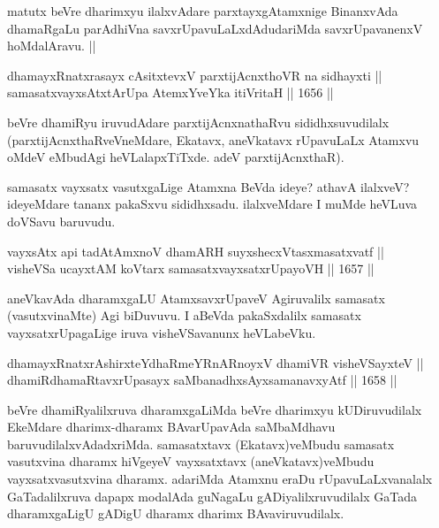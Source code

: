 \begin{artha}
matutx beVre dharimxyu ilalxvAdare parxtayxgAtamxnige BinanxvAda dhamaRgaLu parAdhiVna savxrUpavuLaLxdAdudariMda savxrUpavanenxV hoMdalAravu. ||
\end{artha}

\begin{shl}
dhamayxRnatxrasayx cAsitxtevxV parxtijAcnxthoVR na sidhayxti || \\
samasatxvayxsAtxtArUpa AtemxYveYka itiVritaH ||  1656 ||  
\end{shl}

\begin{artha}
beVre dhamiRyu iruvudAdare parxtijAcnxnathaRvu sididhxsuvudilalx (parxtijAcnxthaRveVneMdare, Ekatavx, aneVkatavx rUpavuLaLx Atamxvu oMdeV eMbudAgi heVLalapxTiTxde. adeV parxtijAcnxthaR).
\end{artha}

\begin{artha}
samasatx vayxsatx vasutxgaLige Atamxna BeVda ideye? athavA ilalxveV? ideyeMdare tananx pakaSxvu sididhxsadu. ilalxveMdare I muMde heVLuva doVSavu baruvudu.
\end{artha}

\begin{shl}
vayxsAtx api tadAtAmxnoV dhamARH suyxshecxVtasxmasatxvatf || \\
visheVSa ucayxtAM koV\s tarx samasatxvayxsatxrUpayoVH ||  1657 ||  
\end{shl}

\begin{artha}
aneVkavAda dharamxgaLU AtamxsavxrUpaveV Agiruvalilx samasatx (vasutxvinaMte) Agi biDuvuvu. I aBeVda pakaSxdalilx samasatx vayxsatxrUpagaLige iruva visheVSavanunx heVLabeVku.
\end{artha}


\begin{shl}
dhamayxRnatxrAshirxteYdhaRmeYRnARnoyxV dhamiVR visheVSayxteV || \\
dhamiRdhamaRtavxrUpasayx saMbanadhxsAyxsamanavxyAtf ||  1658 ||  
\end{shl}

\begin{artha}
beVre dhamiRyalilxruva dharamxgaLiMda beVre dharimxyu kUDiruvudilalx EkeMdare dharimx-dharamx BAvarUpavAda saMbaMdhavu baruvudilalxvAdadxriMda. samasatxtavx (Ekatavx)veMbudu samasatx vasutxvina dharamx hiVgeyeV vayxsatxtavx (aneVkatavx)veMbudu vayxsatxvasutxvina dharamx. adariMda Atamxnu eraDu rUpavuLaLxvanalalx GaTadalilxruva dapapx modalAda guNagaLu gADiyalilxruvudilalx GaTada dharamxgaLigU gADigU dharamx dharimx BAvaviruvudilalx.
\end{artha}

